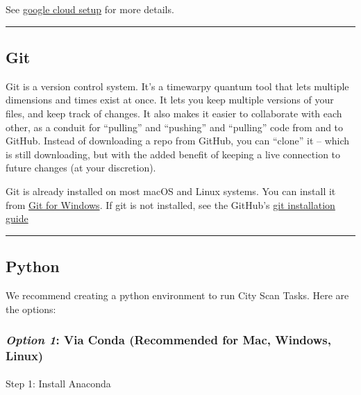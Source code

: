 \documentclass[
  letterpaper,
  DIV=11,
  numbers=noendperiod]{scrreprt}
\makeatletter
\let\oldparagraph\paragraph
\renewcommand{\paragraph}{
    \@ifstar
      \xxxParagraphStar
      \xxxParagraphNoStar
  }
\newcommand{\xxxParagraphStar}[1]{\oldparagraph*{#1}\mbox{}}
\newcommand{\xxxParagraphNoStar}[1]{\oldparagraph{#1}\mbox{}}
\makeatother
\begin{document}
See \href{../reference/googlecloud.md}{google cloud setup} for more
details.

\begin{center}\rule{0.5\linewidth}{0.5pt}\end{center}

\subsection{Git}\label{git}

Git is a version control system. It's a timewarpy quantum tool that lets
multiple dimensions and times exist at once. It lets you keep multiple
versions of your files, and keep track of changes. It also makes it
easier to collaborate with each other, as a conduit for ``pulling'' and
``pushing'' and ``pulling'' code from and to GitHub. Instead of
downloading a repo from GitHub, you can ``clone'' it -- which is still
downloading, but with the added benefit of keeping a live connection to
future changes (at your discretion).

Git is already installed on most macOS and Linux systems. You can
install it from \href{https://gitforwindows.org/}{Git for Windows}. If
git is not installed, see the GitHub's
\href{https://github.com/git-guides/install-git}{git installation guide}

\begin{center}\rule{0.5\linewidth}{0.5pt}\end{center}

\subsection{Python}\label{python}

We recommend creating a python environment to run City Scan Tasks. Here
are the options:

\subsubsection{\texorpdfstring{\emph{Option 1}: Via Conda (Recommended
for Mac, Windows,
Linux)}{Option 1: Via Conda (Recommended for Mac, Windows, Linux)}}\label{option-1-via-conda-recommended-for-mac-windows-linux}

\paragraph{Step 1: Install Anaconda}\label{step-1-install-anaconda}
\end{document}
